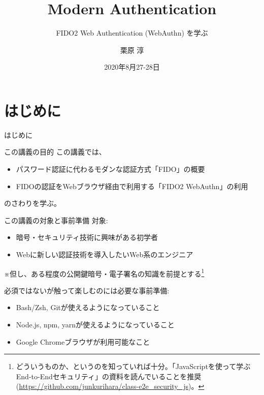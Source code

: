 \documentclass[12pt,dvipdfmx,uplatex]{beamer}
\title[Modern Authentication]{Modern Authentication}
\subtitle{FIDO2 Web Authentication (WebAuthn) を学ぶ}
\author[Jun Kurihara]{栗原 淳}
\institute[U-Hyogo/Zettant]{兵庫県立大学 大学院応用情報科学研究科 \\ 株式会社ゼタント}
\date[Aug. 27-28, 2020]{2020年8月27-28日}
\begin{document}
\begin{frame}
\titlepage
\end{frame}

\section{はじめに}
\begin{frame}
 \centering
 {\Large はじめに}
\end{frame}



\begin{frame}{この講義の目的}
この講義では、
\begin{itemize}
 \item パスワード認証に代わるモダンな認証方式「FIDO」の概要
 \item FIDOの認証をWebブラウザ経由で利用する「FIDO2 WebAuthn」の利用
\end{itemize}
のさわりを学ぶ。
\end{frame}

\begin{frame}{この講義の対象と事前準備}
対象:
\begin{itemize}
\item 暗号・セキュリティ技術に興味がある初学者
\item Webに新しい認証技術を導入したいWeb系のエンジニア
\end{itemize}

\vspace{2ex}

※但し、ある程度の公開鍵暗号・電子署名の知識を前提とする\footnote[frame]{\scriptsize どういうものか、というのを知っていれば十分。「JavaScriptを使って学ぶEnd-to-Endセキュリティ」の資料を読んでいることを推奨 (\url{https://github.com/junkurihara/class-e2e_security_js})。}

\vspace{2ex}

必須ではないが触って楽しむのには必要な事前準備:
\begin{itemize}
\item Bash/Zsh, Gitが使えるようになっていること
\item Node.js, npm, yarnが使えるようになっていること
\item Google Chromeブラウザが利用可能なこと
\end{itemize}
\end{frame}
\end{document}
